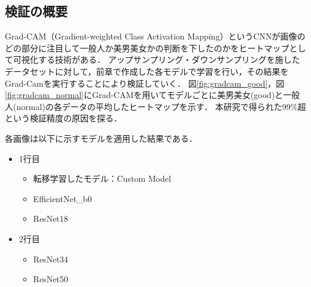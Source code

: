 \documentclass[a4paper,11pt,titlepage]{jsarticle}
\begin{document}
\subsection{検証の概要}
Grad-CAM（Gradient-weighted Class Activation Mapping）というCNNが画像のどの部分に注目して一般人か美男美女かの判断を下したのかをヒートマップとして可視化する技術がある\cite{gradcam}．
アップサンプリング・ダウンサンプリングを施したデータセットに対して，前章で作成した各モデルで学習を行い，その結果をGrad-Camを実行することにより検証していく．
図\ref{fig:gradcam_good}，図\ref{fig:gradcam_normal}にGrad-CAMを用いてモデルごとに美男美女(good)と一般人(normal)の各データの平均したヒートマップを示す．
本研究で得られた99\%超という検証精度の原因を探る．\par
各画像は以下に示すモデルを適用した結果である．
\begin{itemize}
	\item 1行目
	\begin{itemize}
	\item 転移学習したモデル：Custom Model
	\item EfficientNet\_b0
	\item ResNet18
	\end{itemize}
	\item 2行目
	\begin{itemize}
	\item ResNet34
	\item ResNet50
	\end{itemize}
\end{itemize}
\end{document}
